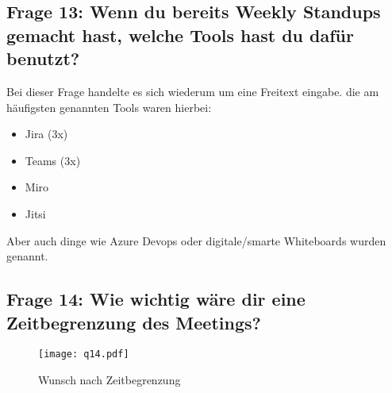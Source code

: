 \subsection{Frage 13: Wenn du bereits Weekly Standups gemacht hast, welche Tools hast du dafür benutzt?}
Bei dieser Frage handelte es sich wiederum um eine Freitext eingabe. die am häufigsten genannten Tools waren hierbei:
\begin{itemize}
    \item Jira (3x)
    \item Teams (3x)
    \item Miro
    \item Jitsi
\end{itemize}
Aber auch dinge wie Azure Devops oder digitale/smarte Whiteboards wurden genannt.

\subsection{Frage 14: Wie wichtig wäre dir eine Zeitbegrenzung des Meetings?}
\begin{figure}[H]
	\centering
	\texttt{[image: q14.pdf]}
    \caption{Wunsch nach Zeitbegrenzung}
	\label{fig:q14}
\end{figure} 




